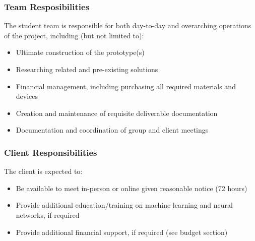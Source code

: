 \subsubsection{Team Resposibilities}
The student team is responsible for both day-to-day and overarching operations of the project, including (but not limited to):
\begin{itemize}
\item Ultimate construction of the prototype(s)
\item Researching related and pre-existing solutions
\item Financial management, including purchasing all required materials and devices
\item Creation and maintenance of requisite deliverable documentation
\item Documentation and coordination of group and client meetings
\end{itemize}
\subsubsection{Client Responsibilities}
The client is expected to:
\begin{itemize}
\item Be available to meet in-person or online given reasonable notice (72 hours)
\item Provide additional education/training on machine learning and neural networks, if required
\item Provide additional financial support, if required (see budget section)
\end{itemize}